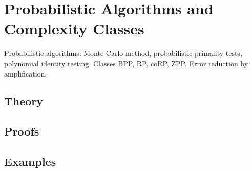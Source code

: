 
\section{Probabilistic Algorithms and Complexity Classes}
\label{sec:2.3a.14-probabilistic-classes}

\begin{ticket}
Probabilistic algorithms: Monte Carlo method, probabilistic primality tests, polynomial identity testing. Classes BPP, RP, coRP, ZPP. Error reduction by amplification.
\end{ticket}

\subsection*{Theory}

\subsection*{Proofs}

\subsection*{Examples}
